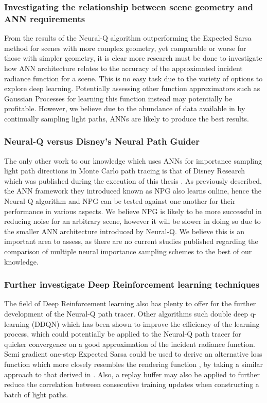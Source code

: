 \documentclass[../dissertation.tex]{subfiles}
\begin{document}
\subsubsection{Investigating the relationship between scene geometry and ANN requirements}

From the results of the Neural-Q algorithm outperforming the Expected Sarsa method for scenes with more complex geometry, yet comparable or worse for those with simpler geometry, it is clear more research must be done to investigate how ANN architecture relates to the accuracy of the approximated incident radiance function for a scene. This is no easy task due to the variety of options to explore deep learning. Potentially assessing other function approximators such as Gaussian Processes for learning this function instead may potentially be profitable. However, we believe due to the abundance of data available in by continually sampling light paths, ANNs are likely to produce the best results. 

\subsubsection{Neural-Q versus Disney's Neural Path Guider}

The only other work to our knowledge which uses ANNs for importance sampling light path directions in Monte Carlo path tracing is that of Disney Research which was published during the execution of this thesis \cite{muller2018neural}. As previously described, the ANN framework they introduced known as NPG also learns online, hence the Neural-Q algorithm and NPG can be tested against one another for their performance in various aspects. We believe NPG is likely to be more successful in reducing noise for an arbitrary scene, however it will be slower in doing so due to the smaller ANN architecture introduced by Neural-Q. We believe this is an important area to assess, as there are no current studies published regarding the comparison of multiple neural importance sampling schemes to  the best of our knowledge.

\subsubsection{Further investigate Deep Reinforcement learning techniques}

The field of Deep Reinforcement learning also has plenty to offer for the further development of the Neural-Q path tracer. Other algorithms such double deep q-learning (DDQN) which has been shown to improve the efficiency of the learning process, which could potentially be applied to the Neural-Q path tracer for quicker convergence on a good approximation of the incident radiance function. Semi gradient one-step Expected Sarsa could be used to derive an alternative loss function which more closely resembles the rendering function \cite{}, by taking a similar approach to that derived in . Also, a replay buffer may also be applied to further reduce the correlation between consecutive training updates when constructing a batch of light paths.
\end{document}
